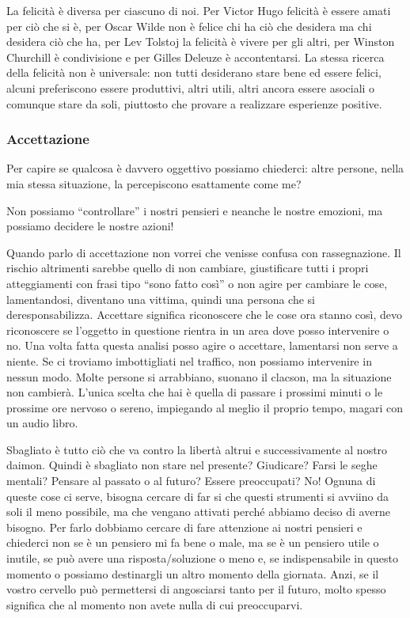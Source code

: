 \documentclass[12pt]{book} %
\begin{document}
La felicità è diversa per ciascuno di noi. Per Victor Hugo felicità è essere amati per ciò che si è, per Oscar Wilde non
è felice chi ha ciò che desidera ma chi desidera ciò che ha, per Lev Tolstoj la felicità è vivere per gli altri, per
Winston Churchill è condivisione e per Gilles Deleuze è accontentarsi. La stessa ricerca della felicità non è
universale: non tutti desiderano stare bene ed essere felici, alcuni preferiscono essere produttivi, altri utili, altri
ancora essere asociali o comunque stare da soli, piuttosto che provare a realizzare esperienze
positive.

\subsubsection{Accettazione}
Per capire se qualcosa è davvero oggettivo possiamo chiederci: altre persone, nella mia stessa situazione, la
percepiscono esattamente come me?

Non possiamo “controllare” i nostri pensieri e neanche le nostre emozioni, ma possiamo decidere le nostre azioni!

Quando parlo di accettazione non vorrei che venisse confusa con rassegnazione. Il rischio altrimenti sarebbe quello di
non cambiare, giustificare tutti i propri atteggiamenti con frasi tipo “sono fatto così” o non agire per cambiare le
cose, lamentandosi, diventano una vittima, quindi una persona che si deresponsabilizza. Accettare significa riconoscere
che le cose ora stanno così, devo riconoscere se l'oggetto in questione rientra in un area dove
posso intervenire o no. Una volta fatta questa analisi posso agire o accettare, lamentarsi non serve a niente. Se ci
troviamo imbottigliati nel traffico, non possiamo intervenire in nessun modo. Molte persone si arrabbiano, suonano il
clacson, ma la situazione non cambierà. L'unica scelta che hai è quella di passare i prossimi
minuti o le prossime ore nervoso o sereno, impiegando al meglio il proprio tempo, magari con un audio libro. 

Sbagliato è tutto ciò che va contro la libertà altrui e successivamente al nostro daimon. Quindi è sbagliato non stare
nel presente? Giudicare? Farsi le seghe mentali? Pensare al passato o al futuro? Essere preoccupati? No! Ognuna di
queste cose ci serve, bisogna cercare di far si che questi strumenti si avviino da soli il meno possibile, ma che
vengano attivati perché abbiamo deciso di averne bisogno. Per farlo dobbiamo cercare di fare attenzione ai nostri
pensieri e chiederci non se è un pensiero mi fa bene o male, ma se è un pensiero utile o inutile, se può avere una
risposta/soluzione o meno e, se indispensabile in questo momento o possiamo destinargli un altro momento della
giornata. Anzi, se il vostro cervello può permettersi di angosciarsi tanto per il futuro, molto spesso significa che al
momento non avete nulla di cui preoccuparvi.
\end{document}
